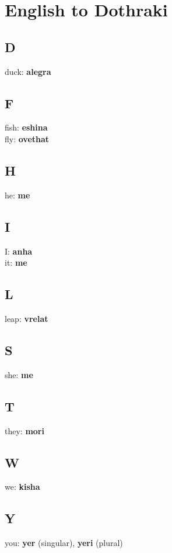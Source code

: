 \section*{English to Dothraki}
\begin{multicols}{2}
\subsection*{D}
duck: \textbf{alegra} \\
\subsection*{F}
fish: \textbf{eshina} \\
fly: \textbf{ovethat} \\
\subsection*{H}
he: \textbf{me} \\
\subsection*{I}
I: \textbf{anha} \\
it: \textbf{me} \\
\subsection*{L}
leap: \textbf{vrelat} \\
\subsection*{S}
she: \textbf{me} \\
\subsection*{T}
they: \textbf{mori} \\
\subsection*{W}
we: \textbf{kisha} \\
\subsection*{Y}
you: \textbf{yer} (singular), \textbf{yeri} (plural) \\
\end{multicols}
